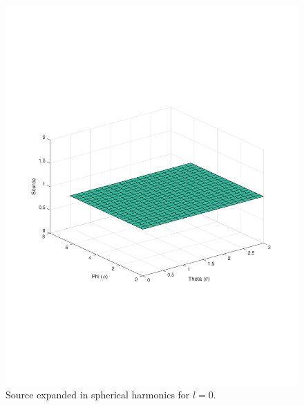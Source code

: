 \documentclass[10pt]{article}
\begin{document}
\begin{figure}[H]
  \centering
  \includegraphics[width=15cm]{l_0.pdf}
  \caption{Source expanded in spherical harmonics for \(l=0\).}
  \label{fig:zero}
\end{figure}
\end{document}
